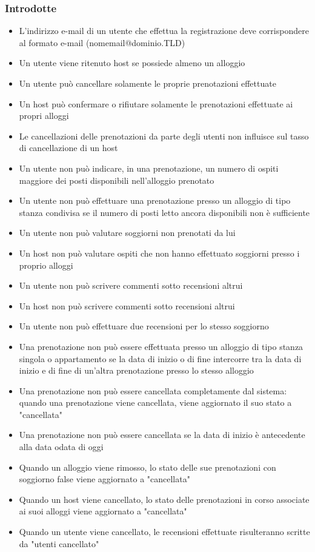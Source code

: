 \subsubsection{Introdotte}
\begin{itemize}
  
  \item L'indirizzo e-mail di un utente che effettua la registrazione deve corrispondere al formato e-mail (nomemail@dominio.TLD)
  \item Un utente viene ritenuto host se possiede almeno un alloggio
  \item Un utente può cancellare solamente le proprie prenotazioni effettuate
  \item Un host può confermare o rifiutare solamente le prenotazioni effettuate ai propri alloggi
  \item Le cancellazioni delle prenotazioni da parte degli utenti non influisce sul tasso di cancellazione di un host
  \item Un utente non può indicare, in una prenotazione, un numero di ospiti maggiore dei posti disponibili nell'alloggio prenotato
  \item Un utente non può effettuare una prenotazione presso un alloggio di tipo stanza condivisa se il numero di posti letto ancora disponibili non è sufficiente
  \item Un utente non può valutare soggiorni non prenotati da lui
  \item Un host non può valutare ospiti che non hanno effettuato soggiorni presso i proprio alloggi
  \item Un utente non può scrivere commenti sotto recensioni altrui
  \item Un host non può scrivere commenti sotto recensioni altrui
  \item Un utente non può effettuare due recensioni per lo stesso soggiorno
  \item Una prenotazione non può essere effettuata presso un alloggio di tipo stanza singola o appartamento se la data di inizio o di fine intercorre tra la data di inizio e di fine di un'altra prenotazione presso lo stesso alloggio
  \item Una prenotazione non può essere cancellata completamente dal sistema: quando una prenotazione viene cancellata, viene aggiornato il suo stato a "cancellata"
  \item Una prenotazione non può essere cancellata se la data di inizio è antecedente alla data odata di oggi
  \item Quando un alloggio viene rimosso, lo stato delle sue prenotazioni con soggiorno false viene aggiornato a "cancellata"
  \item Quando un host viene cancellato, lo stato delle prenotazioni in corso associate ai suoi alloggi viene aggiornato a "cancellata"
  \item Quando un utente viene cancellato, le recensioni effettuate risulteranno scritte da "utenti cancellato"
\end{itemize}